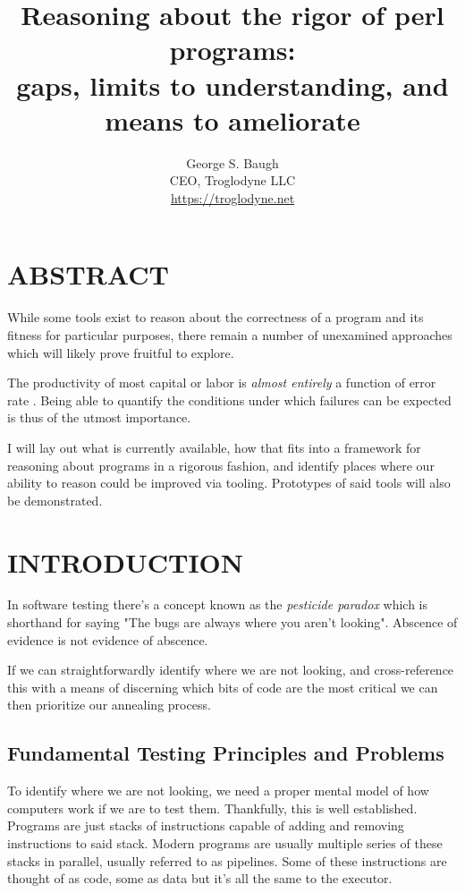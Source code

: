 \documentclass{article}
\title{%
    Reasoning about the rigor of perl programs: \\
    \large gaps, limits to understanding, and means to ameliorate
}
\author{%
    George S. Baugh \\
    \large CEO, Troglodyne LLC \\
    \url{https://troglodyne.net}
}
\begin{document}
\maketitle

\section{ABSTRACT}

While some tools exist to reason about the correctness of a program and its fitness for particular purposes,
there remain a number of unexamined approaches which will likely prove fruitful to explore.

The productivity of most capital or labor is \textit{almost entirely} a function of error rate \cite{oring}.
Being able to quantify the conditions under which failures can be expected is thus of the utmost importance.

I will lay out what is currently available, how that fits into a framework for reasoning about programs
in a rigorous fashion, and identify places where our ability to reason could be improved via tooling.
Prototypes of said tools will also be demonstrated.

\newpage
\section{INTRODUCTION}

In software testing there's a concept known as the \textit{pesticide paradox} \cite{bezier} which is shorthand for saying
"The bugs are always where you aren't looking".  Abscence of evidence is not evidence of abscence.

If we can straightforwardly identify where we are not looking, and cross-reference this with
a means of discerning which bits of code are the most critical we can then prioritize our annealing process.

\subsection{Fundamental Testing Principles and Problems}

To identify where we are not looking, we need a proper mental model of how computers work if we are to test them.
Thankfully, this is well established.
Programs are just stacks of instructions capable of adding and removing instructions to said stack.
Modern programs are usually multiple series of these stacks in parallel, usually referred to as pipelines.
Some of these instructions are thought of as code, some as data but it's all the same to the executor.
\end{document}
